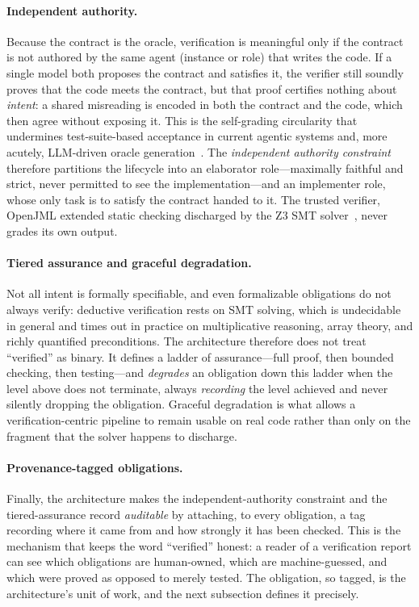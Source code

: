 \paragraph{Independent authority.}
Because the contract is the oracle, verification is meaningful only if the contract is not authored by the same agent (instance or role) that writes the code. If a single model both proposes the contract and satisfies it, the verifier still soundly proves that the code meets the contract, but that proof certifies nothing about \emph{intent}: a shared misreading is encoded in both the contract and the code, which then agree without exposing it. This is the self-grading circularity that undermines test-suite-based acceptance in current agentic systems and, more acutely, LLM-driven oracle generation~\cite{liu2026oracle}. The \emph{independent authority constraint} therefore partitions the lifecycle into an elaborator role---maximally faithful and strict, never permitted to see the implementation---and an implementer role, whose only task is to satisfy the contract handed to it. The trusted verifier, OpenJML extended static checking discharged by the Z3 SMT solver~\cite{cok2014openjml,demoura2008z3}, never grades its own output.

\paragraph{Tiered assurance and graceful degradation.}
Not all intent is formally specifiable, and even formalizable obligations do not always verify: deductive verification rests on SMT solving, which is undecidable in general and times out in practice on multiplicative reasoning, array theory, and richly quantified preconditions. The architecture therefore does not treat ``verified'' as binary. It defines a ladder of assurance---full proof, then bounded checking, then testing---and \emph{degrades} an obligation down this ladder when the level above does not terminate, always \emph{recording} the level achieved and never silently dropping the obligation. Graceful degradation is what allows a verification-centric pipeline to remain usable on real code rather than only on the fragment that the solver happens to discharge.

\paragraph{Provenance-tagged obligations.}
Finally, the architecture makes the independent-authority constraint and the tiered-assurance record \emph{auditable} by attaching, to every obligation, a tag recording where it came from and how strongly it has been checked. This is the mechanism that keeps the word ``verified'' honest: a reader of a verification report can see which obligations are human-owned, which are machine-guessed, and which were proved as opposed to merely tested. The obligation, so tagged, is the architecture's unit of work, and the next subsection defines it precisely.


